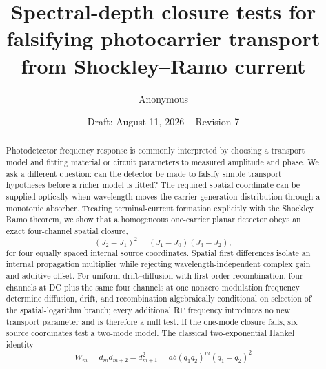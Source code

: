 \documentclass[11pt]{article}
\title{Spectral-depth closure tests for falsifying photocarrier transport from Shockley--Ramo current}
\author{Anonymous}
\date{Draft: August 11, 2026 -- Revision 7}
\begin{document}
\maketitle

\begin{abstract}
Photodetector frequency response is commonly interpreted by choosing a transport model and fitting material or circuit parameters to measured amplitude and phase. We ask a different question: can the detector be made to falsify simple transport hypotheses before a richer model is fitted? The required spatial coordinate can be supplied optically when wavelength moves the carrier-generation distribution through a monotonic absorber. Treating terminal-current formation explicitly with the Shockley--Ramo theorem, we show that a homogeneous one-carrier planar detector obeys an exact four-channel spatial closure,
\begin{equation*}
(J_2-J_1)^2=(J_1-J_0)(J_3-J_2),
\end{equation*}
for four equally spaced internal source coordinates. Spatial first differences isolate an internal propagation multiplier while rejecting wavelength-independent complex gain and additive offset. For uniform drift--diffusion with first-order recombination, four channels at DC plus the same four channels at one nonzero modulation frequency determine diffusion, drift, and recombination algebraically conditional on selection of the spatial-logarithm branch; every additional RF frequency introduces no new transport parameter and is therefore a null test. If the one-mode closure fails, six source coordinates test a two-mode model. The classical two-exponential Hankel identity
\begin{equation*}
W_m=d_m d_{m+2}-d_{m+1}^2
=ab(q_1q_2)^m(q_1-q_2)^2
\end{equation*}

\end{abstract}
\end{document}
